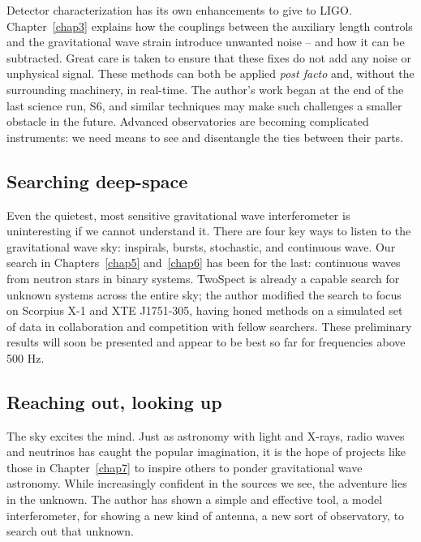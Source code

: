

Detector characterization has its own enhancements to give to LIGO.
Chapter~\ref{chap3} explains how the couplings between the auxiliary length controls and the gravitational wave strain introduce unwanted noise -- and how it can be subtracted.
Great care is taken to ensure that these fixes do not add any noise or unphysical signal.
These methods can both be applied \textit{post facto} and, without the surrounding machinery, in real-time.
The author's work began at the end of the last science run, S6, and similar techniques may make such challenges a smaller obstacle in the future.
Advanced observatories are becoming complicated instruments: we need means to see and disentangle the ties between their parts.

        \subsection{Searching deep-space}
        \label{searching_space}

Even the quietest, most sensitive gravitational wave interferometer is uninteresting if we cannot understand it.
There are four key ways to listen to the gravitational wave sky: inspirals, bursts, stochastic, and continuous wave.
Our search in Chapters~\ref{chap5} and~\ref{chap6} has been for the last: continuous waves from neutron stars in binary systems.
TwoSpect is already a capable search for unknown systems across the entire sky; the author modified the search to focus on Scorpius X-1 and XTE J1751-305, having honed methods on a simulated set of data in collaboration and competition with fellow searchers.
These preliminary results will soon be presented and appear to be best so far for frequencies above 500 Hz.

        \subsection{Reaching out, looking up}
        \label{reaching_out}

The sky excites the mind.
Just as astronomy with light and X-rays, radio waves and neutrinos has caught the popular imagination, it is the hope of projects like those in Chapter~\ref{chap7} to inspire others to ponder gravitational wave astronomy.
While increasingly confident in the sources we see, the adventure lies in the unknown.
The author has shown a simple and effective tool, a model interferometer, for showing a new kind of antenna, a new sort of observatory, to search out that unknown.

